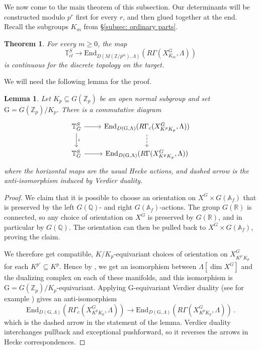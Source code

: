 \documentclass{amsart}
\newtheorem{thm}[subsubsection]{Theorem}
\newtheorem{lem}[subsubsection]{Lemma}
\theoremstyle{remark}
\numberwithin{equation}{subsection}
\newcommand{\A}{\AA}
\newcommand{\Z}{\ZZ}
\renewcommand{\AA}{{\mathbb A}}
\newcommand{\QQ}{{\mathbb Q}}
\newcommand{\RR}{{\mathbb R}}
\newcommand{\ZZ}{{\mathbb Z}}
\newcommand{\Zp}{\Z_p}
\newcommand{\sub}{\subseteq}
\renewcommand{\(}{\left(}
\renewcommand{\)}{\right)}
\begin{document}
We now come to the main theorem of this subsection. Our determinants will be constructed modulo $p^r$ first for every $r$, and then glued together at the end. Recall the subgroups $K_m$ from \S \ref{subsec: ordinary parts}.

\begin{thm}\label{factors through classical} For every $m\geq 0$, the map 
\[
\mathbb{T}^S_{cl}\to \mathrm{End}_{D(M(\Z/p^m), \Lambda)}\left(R\Gamma(X_{K_m}^G,\Lambda)\right)
\] 
is continuous for the discrete topology on the target.
\end{thm}

We will need the following lemma for the proof.

\begin{lem} \label{verdier}
Let $K_p \sub G(\Zp)$ be an open normal subgroup and set $\mathrm{G}=G(\Zp)/K_p$. There is a commutative diagram
\[
\begin{tikzcd}
\mathbb{T}^S_G \arrow[r] \arrow[d,"\iota"] & \mathrm{End}_{D(\mathrm{G},\Lambda)}(R\Gamma_c(X_{K^p K_p}^G,\Lambda)) \arrow[d,dashed] \\
\mathbb{T}^S_G \arrow[r] & \mathrm{End}_{D(\mathrm{G},\Lambda)}(R\Gamma(X_{K^p K_p}^G,\Lambda))
\end{tikzcd}
\]
where the horizontal maps are the usual Hecke actions,
and dashed arrow is the anti-isomorphism induced by Verdier duality.
\end{lem}

\begin{proof}
We claim that it is possible to choose an orientation on
$X^G \times G(\A_f)$
that is preserved by the left $G(\QQ)$- and right $G(\A_f)$-actions.
The group $G(\RR)$ is connected, so any choice of orientation on $X^G$
is preserved by $G(\RR)$, and in particular by $G(\QQ)$.
The orientation can then
be pulled back to $X^G \times G(\A_f)$, proving the claim.

\medskip

We therefore get compatible, $K/K_p$-equivariant choices of orientation on
$X_{K^{p\prime} K_p}^G$ for each $K^{p \prime} \subseteq K^p$.
Hence by \cite[\S 3.3]{kashiwara-schapira}
, we get an isomorphism between
$\Lambda[\dim X^G]$ and the dualizing complex on each of these
manifolds, and this isomorphism is $\mathrm{G}=G(\Zp)/K_p$-equivariant.
Applying $\mathrm{G}$-equivariant Verdier duality (see for example
\cite[\S 3.5]{bernstein-lunts})
gives an anti-isomorphism
\[ \mathrm{End}_{D(\mathrm{G},\Lambda)}(R\Gamma_c(X_{K^p K_p}^G,\Lambda))
\to \mathrm{End}_{D(\mathrm{G},\Lambda)}(R\Gamma(X_{K^p K_p}^G, \Lambda)) \,. \]
which is the dashed arrow in the statement of the lemma.
Verdier duality interchanges pullback and exceptional pushforward,
so it reverses the arrows in Hecke correspondences.
\end{proof}
\end{document}
